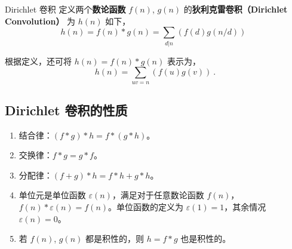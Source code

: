 
\begin{definition}{Dirichlet 卷积}
定义两个\textbf{数论函数} $f(n)$, $g(n)$ 的\textbf{狄利克雷卷积（Dirichlet Convolution）} 为 $h(n)$ 如下，
\begin{equation}
h(n) = f(n) * g(n) = \sum_{d|n}\left(f(d) g(n/d)\right) ~~
\end{equation}
\end{definition}
根据定义，还可将 $h(n) = f(n) * g(n)$ 表示为，
\begin{equation}
h(n) = \sum_{uv = n} (f(u) g(v)) ~.
\end{equation}

\subsection{Dirichlet 卷积的性质}
\begin{enumerate}
\item 结合律：$(f*g)*h = f*(g*h)$。
\item 交换律：$f*g = g*f$。
\item 分配律：$(f+g)*h = f*h + g*h$。
\item 单位元是单位函数 $\varepsilon(n)$，满足对于任意数论函数 $f(n)$，$f(n)*\varepsilon(n) = f(n)$。单位函数的定义为 $\varepsilon(1)=1$，其余情况 $\varepsilon(n) = 0$。
\item 若 $f(n)$, $g(n)$ 都是积性的，则 $h = f*g$ 也是积性的。
\end{enumerate}
